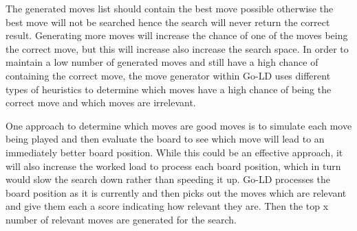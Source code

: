 \documentclass{l4proj}
\begin{document}
The generated moves list should contain the best move possible otherwise the best move will not be searched hence the search will never return the correct result. Generating more moves will increase the chance of one of the moves being the correct move, but this will increase also increase the search space. In order to maintain a low number of generated moves and still have a high chance of containing the correct move, the move generator within Go-LD uses different types of heuristics to determine which moves have a high chance of being the correct move and which moves are irrelevant.

One approach to determine which moves are good moves is to simulate each move being played and then evaluate the board to see which move will lead to an immediately better board position. While this could be an effective approach, it will also increase the worked load to process each board position, which in turn would slow the search down rather than speeding it up. Go-LD processes the board position as it is currently and then picks out the moves which are relevant and give them each a score indicating how relevant they are. Then the top x number of relevant moves are generated for the search.
\end{document}
